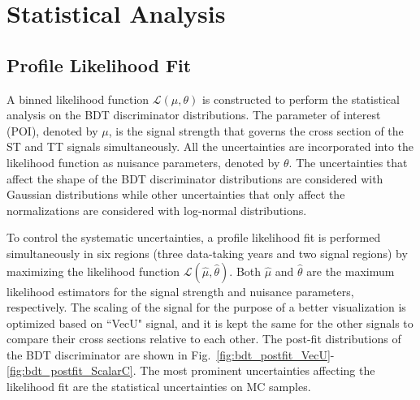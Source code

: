 \chapter{Statistical Analysis}
\label{chap:Results}

\section{Profile Likelihood Fit}
\label{sec:PLF}

A binned likelihood function $\mathcal{L}(\mu, \theta)$ is constructed to perform the statistical analysis on the BDT discriminator distributions. The parameter of interest (POI), denoted by $\mu$, is the signal strength that governs the cross section of the ST and TT signals simultaneously. All the uncertainties are incorporated into the likelihood function as nuisance parameters, denoted by $\theta$. The uncertainties that affect the shape of the BDT discriminator distributions are considered with Gaussian distributions while other uncertainties that only affect the normalizations are considered with log-normal distributions. 

To control the systematic uncertainties, a profile likelihood fit is performed simultaneously in six regions (three data-taking years and two signal regions) by maximizing the likelihood function $\mathcal{L}(\hat{\mu}, \hat{\theta})$. Both $\hat{\mu}$ and $\hat{\theta}$ are the maximum likelihood estimators for the signal strength and nuisance parameters, respectively. The scaling of the signal for the purpose of a better visualization is optimized based on ``VecU" signal, and it is kept the same for the other signals to compare their cross sections relative to each other. The post-fit distributions of the BDT discriminator are shown in Fig.~\ref{fig:bdt_postfit_VecU}-\ref{fig:bdt_postfit_ScalarC}. The most prominent uncertainties affecting the likelihood fit are the statistical uncertainties on MC samples.

